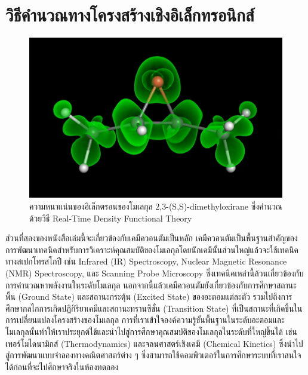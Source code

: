 

\chapter{วิธีคำนวณทางโครงสร้างเชิงอิเล็กทรอนิกส์}
\label{ch:el_strct}

\begin{figure}[H]
    \centering
    \includegraphics[width=0.65\linewidth]{fig/electron_density.png}
    \caption{ความหนาแน่นของอิเล็กตรอนของโมเลกุล 2,3-(S,S)-dimethyloxirane ซึ่งคำนวณด้วยวิธี Real-Time Density Functional Theory}
    \label{fig:elec_density}
\end{figure}

ส่วนที่สองของหนังสือเล่มนี้จะเกี่ยวข้องกับเคมีควอนตัมเป็นหลัก เคมีควอนตัมเป็นพื้นฐานสำคัญของการพัฒนาเทคนิคสำหรับการวิเคราะห์คุณสมบัติของโมเลกุลโดยนักเคมีนั้นส่วนใหญ่แล้วจะใช้เทคนิคทางสเปกโทรสโกปี เช่น Infrared (IR) Spectroscopy, Nuclear Magnetic Resonance (NMR) Spectroscopy, และ Scanning Probe Microscopy ซึ่งเทคนิคเหล่านี้ล้วนเกี่ยวข้องกับการคำนวณหาพลังงานในระดับโมเลกุล นอกจากนี้แล้วเคมีควอนตัมยังเกี่ยวข้องกับการศึกษาสถานะพื้น (Ground State) และสถานะกระตุ้น (Excited State) ของอะตอมแต่ละตัว รวมไปถึงการศึกษากลไกการเกิดปฏิกิริยาเคมีและสถานะทรานซิชั่น (Transition State) ที่เป็นสถานะที่เกิดขึ้นในการเปลี่ยนแปลงโครงสร้างของโมเลกุล การที่เราเข้าใจองค์ความรู้ขั้นพื้นฐานในระดับอะตอมและโมเลกุลนั้นทำให้เราประยุกต์ใช้และนำไปสู่การศึกษาคุณสมบัติของโมเลกุลในระดับที่ใหญ่ขึ้นได้ เช่น เทอร์โมไดนามิกส์ (Thermodynamics) และจลนศาสตร์เชิงเคมี (Chemical Kinetics) ซึ่งนำไปสู่การพัฒนาแบบจำลองทางคณิตศาสตร์ต่าง ๆ ซึ่งสามารถใช้คอมพิวเตอร์ในการศึกษาระบบที่เราสนใจได้ก่อนที่จะไปศึกษาจริงในห้องทดลอง

